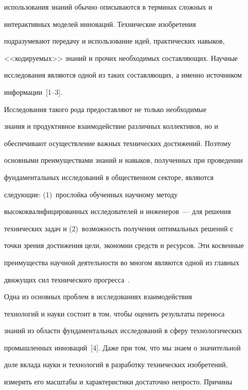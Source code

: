 использования знаний обычно описываются в терминах сложных и 


интерактивных моделей инноваций. Технические изобретения 


подразумевают передачу и использование идей, практических навыков, 


<<кодируемых>> знаний и прочих необходимых составляющих. Научные 


исследования являются одной из таких составляющих, а именно источником 


информации~[1--3]. 


     


     Исследования такого рода предоставляют не только необходимые 


знания и продуктивное взаимодействие различных коллективов, но и 


обеспечивают осуществление важных технических достижений. Поэтому 


основными преимуществами знаний и навыков, полученных при проведении 


фундаментальных исследований в общественном секторе, являются 


следующие: (1)~прослойка обученных научному методу 


высококвалифицированных исследователей и инженеров~--- для решения 


технических задач и (2)~возможность получения оптимальных решений с 


точки зрения достижения цели, экономии средств и ресурсов. Эти косвенные 


преимущества научной деятельности во многом являются одной из главных 


движущих сил технического прогресса~\cite{1-koz, 2-koz}.


     


     Одна из основных проблем в исследованиях взаимодействия 


технологий и науки состоит в том, чтобы оценить результаты переноса 


знаний из области фундаментальных исследований в сферу технологических 


промышленных инноваций~[4]. Даже при том, что мы знаем о значительной 


доле вклада науки и технологий в разработку технических изобретений, 


измерить его масштабы и характеристики достаточно непросто. Причины 



